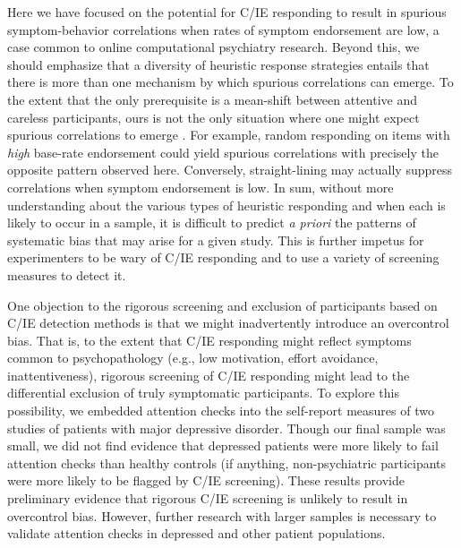 \documentclass[a4paper,notitlepage,12pt]{article}
\begin{document}
\begin{refsection}[main]
Here we have focused on the potential for C/IE responding to result in spurious symptom-behavior correlations when rates of symptom endorsement are low, a case common to online computational psychiatry research. Beyond this, we should emphasize that a diversity of heuristic response strategies entails that there is more than one mechanism by which spurious correlations can emerge. To the extent that the only prerequisite is a mean-shift between attentive and careless participants, ours is not the only situation where one might expect spurious correlations to emerge \cite{huang2015insufficient}. For example, random responding on items with \emph{high} base-rate endorsement could yield spurious correlations with precisely the opposite pattern observed here. Conversely, straight-lining may actually suppress correlations when symptom endorsement is low. In sum, without more understanding about the various types of heuristic responding and when each is likely to occur in a sample, it is difficult to predict {\it a priori} the patterns of systematic bias that may arise for a given study. This is further impetus for experimenters to be wary of C/IE responding and to use a variety of screening measures to detect it. 

One objection to the rigorous screening and exclusion of participants based on C/IE detection methods is that we might inadvertently introduce an overcontrol bias. That is, to the extent that C/IE responding might reflect symptoms common to psychopathology (e.g., low motivation, effort avoidance, inattentiveness), rigorous screening of C/IE responding might lead to the differential exclusion of truly symptomatic participants. To explore this possibility, we embedded attention checks into the self-report measures of two studies of patients with major depressive disorder. Though our final sample was small, we did not find evidence that depressed patients were more likely to fail attention checks than healthy controls (if anything, non-psychiatric participants were more likely to be flagged by C/IE screening). These results provide preliminary evidence that rigorous C/IE screening is unlikely to result in overcontrol bias. However, further research with larger samples is necessary to validate attention checks in depressed and other patient populations. 


\end{refsection}
\end{document}
